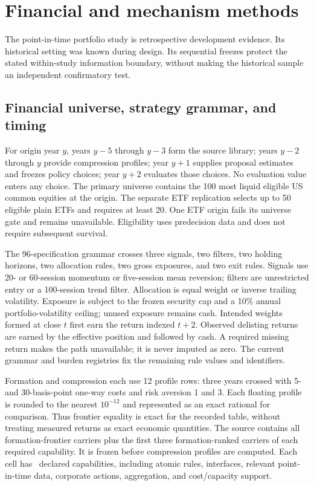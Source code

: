 \section{Financial and mechanism methods}
\label{sec:supp-point-in-time-financial}

The point-in-time portfolio study is retrospective development evidence.
Its historical setting was known during design. Its sequential freezes protect
the stated within-study information boundary, without making the historical
sample an independent confirmatory test.

\subsection{Financial universe, strategy grammar, and timing}

For origin year \(y\), years \(y-5\) through \(y-3\) form the source library;
years \(y-2\) through \(y\) provide compression profiles; year \(y+1\) supplies
proposal estimates and freezes policy choices; year \(y+2\) evaluates those
choices. No evaluation value enters any choice. The primary universe contains
the 100 most liquid eligible US common equities at the origin. The separate
ETF replication selects up to 50 eligible plain ETFs and requires at least 20.
One ETF origin fails its universe gate and remains unavailable. Eligibility
uses predecision data and does not require subsequent survival.

The 96-specification grammar crosses three signals, two filters, two holding
horizons, two allocation rules, two gross exposures, and two exit rules.
Signals use 20- or 60-session momentum or five-session mean reversion; filters
are unrestricted entry or a 100-session trend filter. Allocation is equal
weight or inverse trailing volatility. Exposure is subject to the frozen
security cap and a 10\% annual portfolio-volatility ceiling; unused exposure
remains cash. Intended weights formed at close \(t\) first earn the return
indexed \(t+2\). Observed delisting returns are earned by the effective
position and followed by cash. A required missing return makes the path
unavailable; it is never imputed as zero. The current grammar and burden
registries fix the remaining rule values and identifiers.

Formation and compression each use 12 profile rows: three years crossed with
5- and 30-basis-point one-way costs and risk aversion 1 and 3. Each floating
profile is rounded to the nearest \(10^{-12}\) and represented as an exact
rational for comparison. Thus frontier equality is exact for the recorded
table, without treating measured returns as exact economic quantities.
The source contains all formation-frontier carriers plus the first three
formation-ranked carriers of each required capability. It is frozen before
compression profiles are computed. Each cell has
\AORPointInTimeCapabilities\ declared capabilities, including atomic rules,
interfaces, relevant point-in-time data, corporate actions, aggregation, and
cost/capacity support.

